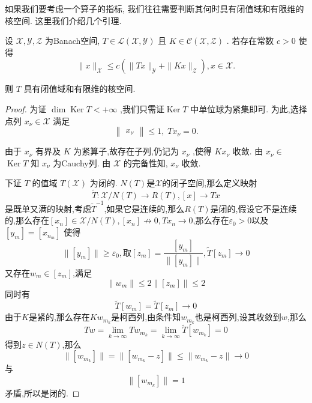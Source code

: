 \documentclass[lang=cn,newtx,10pt,scheme=chinese,thmcnt=chapter]{elegantbook}
\newcommand{\Ker}{\operatorname{Ker}}
\begin{document}
如果我们要考虑一个算子的指标, 我们往往需要判断其何时具有闭值域和有限维的核空间. 这里我们介绍几个引理.
\begin{lemma}
     设 \(\mathcal{X},\mathcal{Y},\mathcal{Z}\) 为Banach空间, \(T \in  \mathcal{L}\left( {\mathcal{X},\mathcal{Y}}\right)\) 且 \(K \in  \mathcal{C}\left( {\mathcal{X},\mathcal{Z}}\right)\) . 若存在常数 \(c > 0\) 使得
\begin{equation*}
\parallel x{\parallel }_{\mathcal{X}} \leqslant  c\left( {\parallel {Tx}{\parallel }_{\mathcal{Y}} + \parallel {Kx}{\parallel }_{\mathcal{Z}}}\right) ,x \in  \mathcal{X}. \label{4.18}
\end{equation*}

则 \(T\) 具有闭值域和有限维的核空间.
\end{lemma}
\begin{proof}
     为证 \(\dim\Ker T <  + \infty\) ,我们只需证\(\Ker T\) 中单位球为紧集即可. 为此,选择点列 \({x}_{\nu } \in  \mathcal{X}\) 满足
\begin{equation*}
\begin{Vmatrix}{x}_{\nu }\end{Vmatrix} \leqslant  1,\;T{x}_{\nu } = 0.
\end{equation*}

由于 \({x}_{\nu }\) 有界及 \(K\) 为紧算子,故存在子列,仍记为 \({x}_{\nu }\) ,使得 \(K{x}_{\nu }\) 收敛. 由 \({x}_{\nu } \in\)  \(\operatorname{Ker}T\) 知 \({x}_{\nu }\) 为Cauchy列. 由 \(\mathcal{X}\) 的完备性知, \({x}_{\nu }\) 收敛.

下证 \(T\) 的值域 \(T\left( \mathcal{X}\right)\) 为闭的.  $N(T)$是$\mathcal{X}$的闭子空间,那么定义映射\[
    \widetilde{T}:\mathcal{X}/N(T)\to R(T),[x]\to T x
    \]
    是既单又满的映射,考虑$\widetilde{T}^{-1}$,如果它是连续的,那么$R(T)$是闭的,假设它不是连续的,那么存在$[x_n]\in \mathcal{X}/N(T),[x_n]\not\to 0,T x_n\to 0$,那么存在$\varepsilon_0>0$以及$[y_m]=[x_{n_{m}}]$
使得\[
\|[y_m]\|\geq \varepsilon_0,\textbf{取}[z_m]=\frac{[y_m]}{\|[y_m]\|},\widetilde{T}[z_m]\to 0
\]
又存在$w_m\in[z_m]$,满足\[
\|w_m\|\leqslant2 \|[z_m]\|\leqslant 2
\]
同时有\[
\widetilde{T}[w_m]=\widetilde{T}[z_m]\to 0
\]
由于$K$是紧的,那么存在$Kw_{m_k}$是柯西列,由条件知$w_{m_k}$也是柯西列,设其收敛到$w$,那么
\[T w=\lim\limits_{k\to \infty}T w_{m_k}=\lim\limits_{k\to \infty}\widetilde{T}[w_{m_k}]=0\]
得到$z\in N(T)$,那么\[
\|[ w_{m_k}]\|=\|[ w_{m_k}-z]\|\leqslant \|w_{m_k}-z\|\to 0
\]
与\[\|[w_{m_k}]\|=1\]
矛盾,所以是闭的.

\end{proof}
\end{document}
